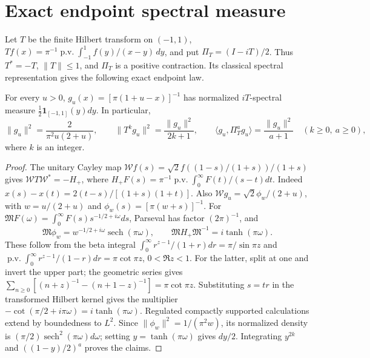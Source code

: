 \section{Exact endpoint spectral measure}\label{eshort:sec}
Let $T$ be the finite Hilbert transform on $(-1,1)$,
$Tf(x)=\pi^{-1}\operatorname{p.v.}\int_{-1}^1 f(y)/(x-y)\,dy$,
and put $\Pi_T=(I-iT)/2$. Thus $T^*=-T$, $\|T\|\le1$, and
$\Pi_T$ is a positive contraction. Its classical spectral representation
\cite{KoppelmanPincus1959} gives the following exact endpoint law.

\begin{proposition}\label{T10:prop:lump}
For every $u>0$, $g_u(x)=[\pi(1+u-x)]^{-1}$ has normalized
$iT$-spectral measure $\tfrac12\mathbf1_{[-1,1]}(y)dy$. In particular,
\begin{equation}\label{eshort:moments}
 \|g_u\|^2=\frac2{\pi^2u(2+u)},\qquad
 \|T^kg_u\|^2=\frac{\|g_u\|^2}{2k+1},\qquad
 \langle g_u,\Pi_T^a g_u\rangle=\frac{\|g_u\|^2}{a+1}
 \quad(k\ge0,\ a\ge0),
\end{equation}
where $k$ is an integer.
\end{proposition}
\begin{proof}
The unitary Cayley map $\mathcal Wf(s)=\sqrt2 f((1-s)/(1+s))/(1+s)$
gives $\mathcal WT\mathcal W^*=-H_+$, where
$H_+F(s)=\pi^{-1}\operatorname{p.v.}\int_0^\infty F(t)/(s-t)dt$.
Indeed $x(s)-x(t)=2(t-s)/[(1+s)(1+t)]$. Also
$\mathcal Wg_u=\sqrt2\phi_w/(2+u)$, with
$w=u/(2+u)$ and $\phi_w(s)=[\pi(w+s)]^{-1}$.
For $\mathfrak MF(\omega)=\int_0^\infty F(s)s^{-1/2+i\omega}ds$,
Parseval has factor $(2\pi)^{-1}$, and
\begin{equation}\label{eshort:mellin}
 \mathfrak M\phi_w=w^{-1/2+i\omega}\operatorname{sech}(\pi\omega),
 \qquad \mathfrak MH_+\mathfrak M^{-1}=i\tanh(\pi\omega).
\end{equation}
These follow from the beta integral
$\int_0^\infty r^{z-1}/(1+r)dr=\pi/\sin\pi z$ and
$\operatorname{p.v.}\int_0^\infty r^{z-1}/(1-r)dr=\pi\cot\pi z$,
$0<\Re z<1$. For the latter, split at one and invert the upper part;
the geometric series gives
$\sum_{n\ge0}[(n+z)^{-1}-(n+1-z)^{-1}]=\pi\cot\pi z$.
Substituting $s=tr$ in the transformed Hilbert kernel gives the
multiplier $-\cot(\pi/2+i\pi\omega)=i\tanh(\pi\omega)$.
Regulated compactly supported calculations extend by boundedness to
$L^2$. Since $\|\phi_w\|^2=1/(\pi^2w)$, its normalized density is
$(\pi/2)\operatorname{sech}^2(\pi\omega)d\omega$; setting
$y=\tanh(\pi\omega)$ gives $dy/2$. Integrating $y^{2k}$ and
$((1-y)/2)^a$ proves the claims.
\end{proof}

